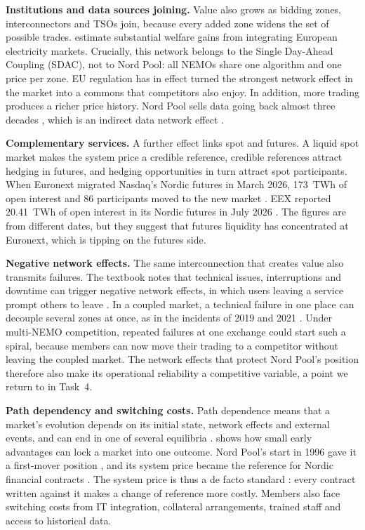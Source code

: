 \textbf{Institutions and data sources joining.} Value also grows as bidding zones, interconnectors and TSOs join, because every added zone widens the set of possible trades. \citet{Newbery2016} estimate substantial welfare gains from integrating European electricity markets. Crucially, this network belongs to the Single Day-Ahead Coupling (SDAC), not to Nord Pool: all NEMOs share one algorithm and one price per zone. EU regulation has in effect turned the strongest network effect in the market into a commons that competitors also enjoy. In addition, more trading produces a richer price history. Nord Pool sells data going back almost three decades \citep{NPData}, which is an indirect data network effect \citep[Sect.~9.3]{OverbyAudestad2021}.

\textbf{Complementary services.} A further effect links spot and futures. A liquid spot market makes the system price a credible reference, credible references attract hedging in futures, and hedging opportunities in turn attract spot participants. When Euronext migrated Nasdaq's Nordic futures in March 2026, 173~TWh of open interest and 86 participants moved to the new market \citep{Euronext2026}. EEX reported 20.41~TWh of open interest in its Nordic futures in July 2026 \citep{EEX2026}. The figures are from different dates, but they suggest that futures liquidity has concentrated at Euronext, which is tipping on the futures side.

\textbf{Negative network effects.} The same interconnection that creates value also transmits failures. The textbook notes that technical issues, interruptions and downtime can trigger negative network effects, in which users leaving a service prompt others to leave \citep[Sect.~9.2]{OverbyAudestad2021}. In a coupled market, a technical failure in one place can decouple several zones at once, as in the incidents of 2019 and 2021 \citep{NPIncident2019,SDAC2021}. Under multi-NEMO competition, repeated failures at one exchange could start such a spiral, because members can now move their trading to a competitor without leaving the coupled market. The network effects that protect Nord Pool's position therefore also make its operational reliability a competitive variable, a point we return to in Task~4.

\textbf{Path dependency and switching costs.} Path dependence means that a market's evolution depends on its initial state, network effects and external events, and can end in one of several equilibria \citep[Def.~11.2]{OverbyAudestad2021}. \citet{Arthur1989} shows how small early advantages can lock a market into one outcome. Nord Pool's start in 1996 gave it a first-mover position \citep{NPAbout}, and its system price became the reference for Nordic financial contracts \citep{NPPrice}. The system price is thus a de facto standard \citep[Def.~15.1]{OverbyAudestad2021}: every contract written against it makes a change of reference more costly. Members also face switching costs \citep[Def.~12.2]{OverbyAudestad2021} from IT integration, collateral arrangements, trained staff and access to historical data.

